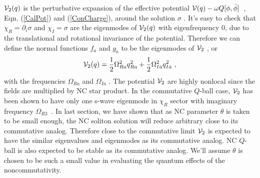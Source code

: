 \documentclass[a4paper,a4paper]{article}
\def\da{{\dot{a}}}
\begin{document}
${\cal V}_2(q)$ is the perturbative expansion of the effective potential 
${\cal V}(q)-\omega Q[\phi,\bar{\phi}]$\ , Eqn. (\ref{CalPot}) and (\ref{ConCharge}), 
around the solution $\sigma$ . 
It's easy to check that $\chi_R=\partial_i\sigma$ and $\chi_I=\sigma$ are the eigenmodes of 
${\cal V}_2(q)$ with eigenfrequency 0, due to the translational and rotational 
invariance of the potential. Therefore we can 
define the normal functions $f_a$ and $g_\da$ to be the eigenmodes of ${\cal V}_2$ , or  
\begin{equation}
  {\cal V}_2(q)=\frac 12\Omega_{Ra}^2q_{Ra}^2+\frac 12\Omega_{I\da}^2q_{I\da}^2\ , 
\end{equation}
with the frequencies $\Omega_{Ra}$ and $\Omega_{I\da}$ . The potential ${\cal V}_2$ 
are highly nonlocal since the fields are multiplied by NC star product. 
In the commutative $Q$-ball case, ${\cal V}_2$ has been shown to have only one s-wave 
eigenmode in $\chi_R$ sector with imaginary frequency $\Omega_{R3}$~\cite{LeeReport}. 
In last section, we have shown that as NC parameter $\theta$ is taken to be small enough, 
the NC soliton solution will reduce arbitrary close to its commutative analog. 
Therefore close to the commutative limit ${\cal V}_2$ is 
expected to have the similar eigenvalues and eigenmodes as its commutative 
analog. NC $Q$-ball is also expected to be stable as its commutative analog. 
We'll assume $\theta$ is chosen to be such a small value in evaluating 
the quantum effects of the noncommutativity. 
\end{document}
